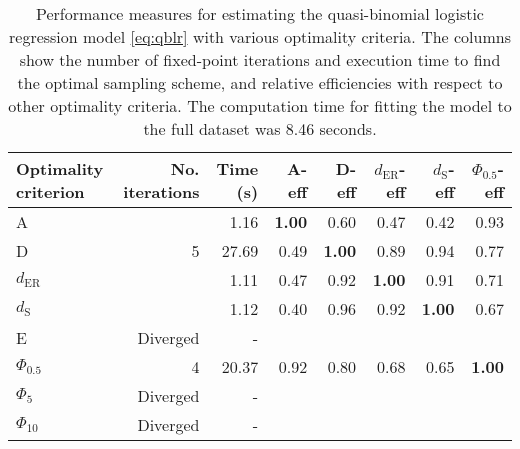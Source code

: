\begin{table}[htb!]
\centering
\caption{Performance measures for estimating the quasi-binomial logistic regression model \eqref{eq:qblr} with various optimality criteria. The columns show the number of fixed-point iterations and execution time to find the optimal sampling scheme, and relative efficiencies with respect to other optimality criteria. The computation time for fitting the model to the full dataset was 8.46 seconds.} 
\label{tab:impact_speed_response_surface}
\begin{tabular}{lrrrrrrr}
 Optimality criterion & No. iterations & Time (s) & A-eff & D-eff & $d_{\mathrm{ER}}$-eff & $d_{\mathrm{S}}$-eff & $\Phi_{0.5}$-eff \\ 
  \hline
A &  & 1.16 & \textbf{1.00} & 0.60 & 0.47 & 0.42 & 0.93 \\ 
  D & 5 & 27.69 & 0.49 & \textbf{1.00} & 0.89 & 0.94 & 0.77 \\ 
  $d_{\mathrm{ER}}$ &  & 1.11 & 0.47 & 0.92 & \textbf{1.00} & 0.91 & 0.71 \\ 
  $d_{\mathrm{S}}$ &  & 1.12 & 0.40 & 0.96 & 0.92 & \textbf{1.00} & 0.67 \\ 
  E & Diverged & - &  &  &  &  &  \\ 
  $\Phi_{0.5}$ & 4 & 20.37 & 0.92 & 0.80 & 0.68 & 0.65 & \textbf{1.00} \\ 
  $\Phi_5$ & Diverged & - &  &  &  &  &  \\ 
  $\Phi_{10}$ & Diverged & - &  &  &  &  &  \\ 
   \hline
\end{tabular}
\end{table}

